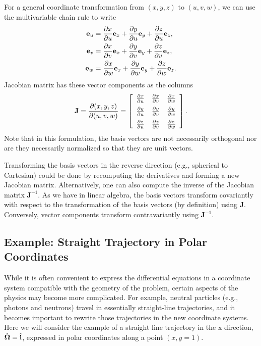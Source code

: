 For a general coordinate transformation from $(x,y,z)$ to $(u,v,w)$, we can use the multivariable chain rule to write
\begin{subequations}
\begin{align}
  \mathbf{e}_u &= \frac{ \partial {x} }{ \partial {u} } \mathbf{e}_x + \frac{ \partial {y} }{ \partial {u} } \mathbf{e}_y + \frac{ \partial {z} }{ \partial {u} } \mathbf{e}_z , \\ 
  \mathbf{e}_v &= \frac{ \partial {x} }{ \partial {v} } \mathbf{e}_x + \frac{ \partial {y} }{ \partial {v} } \mathbf{e}_y + \frac{ \partial {z} }{ \partial {v} } \mathbf{e}_z , \\ 
  \mathbf{e}_w &= \frac{ \partial {x} }{ \partial {w} } \mathbf{e}_x + \frac{ \partial {y} }{ \partial {w} } \mathbf{e}_y + \frac{ \partial {z} }{ \partial {w} } \mathbf{e}_z .
\end{align}
\end{subequations}
Jacobian matrix has these vector components as the columns
\begin{align}
  \mathbf{J} = \frac{ \partial ( x, y, z ) }{ \partial ( u, v, w ) } =
   \left[ \begin{array}{c c c}
   \dho{x}{u} & \dho{x}{v} & \dho{x}{w} \vspace{0.2cm} \\
   \dho{y}{u} & \dho{y}{v} & \dho{y}{w} \vspace{0.2cm}  \\ 
   \dho{z}{u} & \dho{z}{v} & \dho{z}{w} \\ \end{array} \right] .
\end{align}
Note that in this formulation, the basis vectors are not necessarily orthogonal nor are they necessarily normalized so that they are unit vectors.

Transforming the basis vectors in the reverse direction (e.g., spherical to Cartesian) could be done by recomputing the derivatives and forming a new Jacobian matrix. Alternatively, one can also compute the inverse of the Jacobian matrix $\mathbf{J}^{-1}$. As we have in linear algebra, the basis vectors transform covariantly with respect to the transformation of the basis vectors (by definition) using $\mathbf{J}$. Conversely, vector components transform contravariantly using $\mathbf{J}^{-1}$.

\subsection{Example: Straight Trajectory in Polar Coordinates} \label{Sec:vector_coordinateTransformations_exampleStraightTrajectory}

While it is often convenient to express the differential equations in a coordinate system compatible with the geometry of the problem, certain aspects of the physics may become more complicated. For example, neutral particles (e.g., photons and neutrons) travel in essentially straight-line trajectories, and it becomes important to rewrite those trajectories in the new coordinate systems. Here we will consider the example of a straight line trajectory in the x direction, $\hat{\mathbf{\Omega}} = \hat{\mathbf{i}}$, expressed in polar coordinates along a point $(x,y = 1)$.

